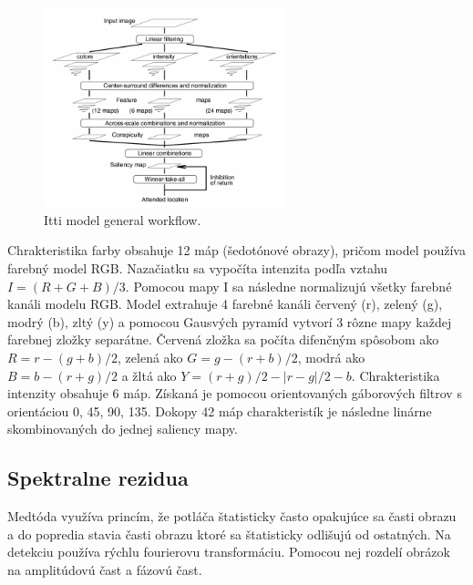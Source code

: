 \begin{figure}[H]
 \centering
 \includegraphics[width=7cm]{pics/itti-1.png}
 \caption{Itti model general workflow.}\label{wrap-fig:1}
\end{figure}
\vspace{10mm}

Chrakteristika farby obsahuje 12 máp (šedotónové obrazy), pričom model používa farebný model RGB. Nazačiatku sa vypočíta intenzita podľa vztahu \begin{math} I = (R+G+B)/3\end{math}. Pomocou mapy I sa následne normalizujú všetky farebné kanáli modelu RGB. Model extrahuje 4 farebné kanáli červený (r), zelený (g), modrý (b), zltý (y) a pomocou Gausvých pyramíd vytvorí 3 rôzne mapy každej farebnej zložky separátne. Červená zložka sa počíta difenčným spôsobom ako \begin{math} R = r - (g + b)/2 \end{math}, zelená ako \begin{math} G = g - (r + b)/2 \end{math}, modrá ako \begin{math}B = b - (r + g)/2\end{math} a žltá ako \begin{math}Y = (r + g)/2 - |r - g|/2 - b\end{math}. Chrakteristika intenzity obsahuje 6 máp. Získaná je pomocou orientovaných gáborových filtrov s orientáciou 0\degree, 45\degree, 90\degree, 135\degree. Dokopy 42 máp charakteristík je následne linárne skombinovaných do jednej saliency mapy\cite{itty-98}.


\subsection{Spektralne rezidua}
Medtóda využíva princím, že potláča štatisticky často opakujúce sa časti obrazu a do popredia stavia časti obrazu ktoré sa štatisticky odlišujú od ostatných. Na detekciu používa rýchlu fourierovu transformáciu. Pomocou nej rozdelí obrázok na amplitúdovú čast a fázovú čast.

